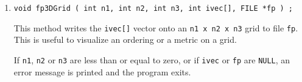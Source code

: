\begin{enumerate}
\item
\begin{verbatim}
void fp3DGrid ( int n1, int n2, int n3, int ivec[], FILE *fp ) ;
\end{verbatim}
This method writes the {\tt ivec[]} vector onto an {\tt n1 x n2 x n3}
grid to file {\tt fp}.
This is useful to visualize an ordering or a metric on a grid.
\par {}
If {\tt n1}, {\tt n2} or {\tt n3} are less than or equal to zero, 
or if {\tt ivec} or {\tt fp} are {\tt NULL},
an error message is printed and the program exits.
\end{enumerate}
\par
